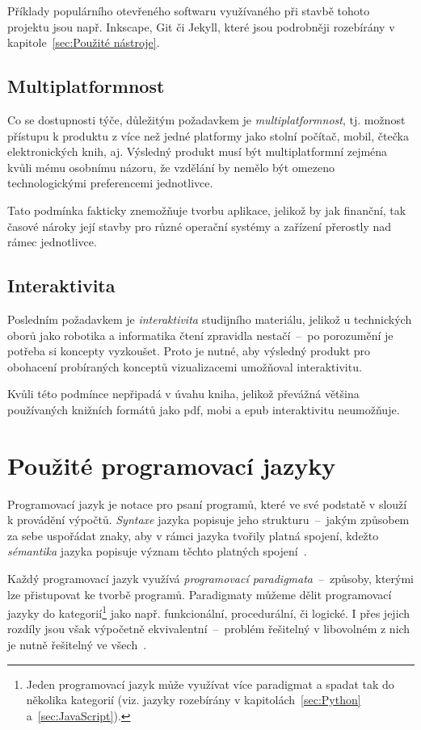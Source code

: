 \documentclass[a4paper, 12pt]{article}
\begin{document}
  Příklady populárního otevřeného softwaru využívaného při stavbě tohoto projektu jsou např. Inkscape, Git či Jekyll, které jsou podrobněji rozebírány v kapitole~\ref{sec:Použité nástroje}.


  \subsection{Multiplatformnost}
  Co se dostupnosti týče, důležitým požadavkem je \emph{multiplatformnost}, tj. možnost přístupu k produktu z více než jedné platformy jako stolní počítač, mobil, čtečka elektronických knih, aj. Výsledný produkt musí být multiplatformní zejména kvůli mému osobnímu názoru, že vzdělání by nemělo být omezeno technologickými preferencemi jednotlivce.

  Tato podmínka fakticky znemožňuje tvorbu aplikace, jelikož by jak finanční, tak časové nároky její stavby pro různé operační systémy a zařízení přerostly nad rámec jednotlivce.


  \subsection{Interaktivita}
  Posledním požadavkem je \emph{interaktivita} studijního materiálu, jelikož u technických oborů jako robotika a informatika čtení zpravidla nestačí~--~po porozumění je potřeba si koncepty vyzkoušet. Proto je nutné, aby výsledný  produkt pro obohacení probíraných konceptů vizualizacemi umožňoval interaktivitu.

  Kvůli této podmínce nepřipadá v úvahu kniha, jelikož převážná většina používaných knižních formátů jako \gls{pdf}, \gls{mobi} a \gls{epub} interaktivitu neumožňuje.


  \section{Použité programovací jazyky} \label{sec:Použité programovací jazyky}
  Programovací jazyk je notace pro psaní programů, které ve své podstatě v slouží k provádění výpočtů. \emph{Syntaxe} jazyka popisuje jeho strukturu~--~jakým způsobem za sebe uspořádat znaky, aby v rámci jazyka tvořily platná spojení, kdežto \emph{sémantika} jazyka popisuje význam těchto platných spojení~\cite{intro-to-programming-languages}.

  Každý programovací jazyk využívá \emph{programovací paradigmata}~--~způsoby, kterými lze přistupovat ke tvorbě programů. Paradigmaty můžeme dělit programovací jazyky do kategorií\footnote{Jeden programovací jazyk může využívat více paradigmat a spadat tak do několika kategorií (viz. jazyky rozebírány v kapitolách~\ref{sec:Python} a~\ref{sec:JavaScript}).} jako např. funkcionální, procedurální, či logické. I přes jejich rozdíly jsou však výpočetně ekvivalentní~--~problém řešitelný v libovolném z nich je nutně řešitelný ve všech~\cite{intro-to-programming-languages}.
\end{document}
